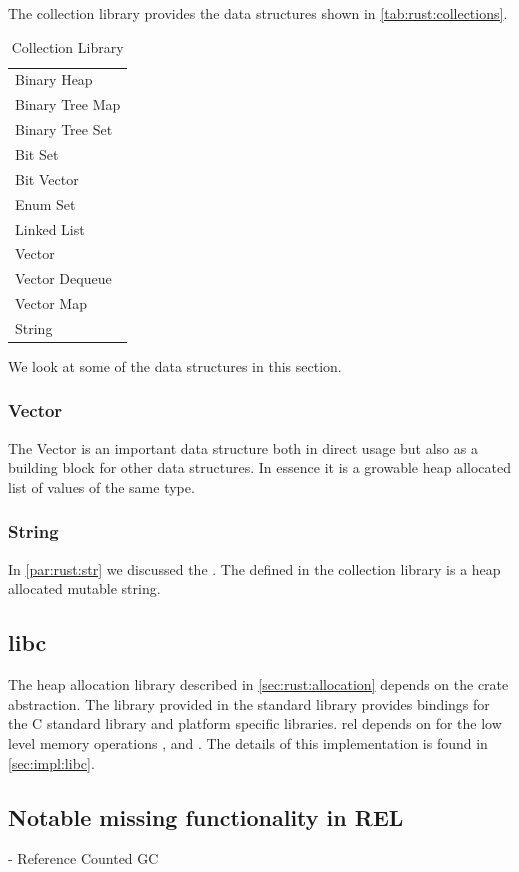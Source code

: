 The {\rust} collection library provides the data structures shown in \autoref{tab:rust:collections}.

\begin{table}[H]
  \begin{tabular}{l}
    Binary Heap \\
    Binary Tree Map \\
    Binary Tree Set \\
    Bit Set \\
    Bit Vector \\
    Enum Set \\
    Linked List \\
    Vector \\
    Vector Dequeue \\
    Vector Map \\
    String \\
  \end{tabular}
  \caption{\rust Collection Library}
  \label{tab:rust:collections}
\end{table}

We look at some of the data structures in this section.

\subsubsection{Vector}

The Vector is an important data structure both in direct usage but also as a building block for other data structures.
In essence it is a growable heap allocated list of values of the same type.

\subsubsection{String}

In \autoref{par:rust:str} we discussed the .
The  defined in the collection library is a heap allocated mutable string.

\subsection{libc}

The heap allocation library described in \autoref{sec:rust:allocation} depends on the  crate abstraction.
The  library provided in the standard library provides bindings for the C standard library and platform specific libraries.
\gls{rel} depends on  for the low level memory operations ,  and .
The details of this implementation is found in \autoref{sec:impl:libc}. 

\subsection{Notable missing functionality in REL}

- Reference Counted GC
